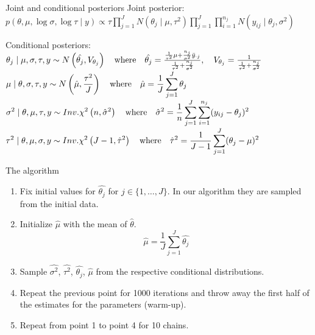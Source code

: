 \begin{frame}{Joint and conditional posteriors}
Joint posterior:\\
\vspace{0.1in}
$\displaystyle p(\theta,\mu,\log\sigma,\log\tau \mid y) \propto \tau \prod_{j=1}^J N(\theta_j \mid \mu,\tau^2) \prod_{j=1}^{J} \prod_{i=1}^{n_j} N(y_{ij} \mid \theta_j,\sigma^2)$

Conditional posteriors:\\
\vspace{0.1in}
$\theta_j \mid \mu, \sigma, \tau, y \sim N  \left( \hat{\theta_j},V_{\theta_j} \right)  \quad \mbox{where} \quad \hat{\theta_j} = { {{1 \over \tau^2} \mu + {n_j \over \sigma^2} \bar{y}_{\cdot j} } \over {{1 \over \tau^2}+{n_j \over \sigma^2}}}, \quad V_{\theta_j}= { 1 \over {{1 \over \tau^2}+{n_j \over \sigma^2}}} $ \\

$ \displaystyle \mu \mid \theta, \sigma, \tau, y \sim N \left( \hat{\mu},{\tau^2 \over J} \right) \quad \mbox{where} \quad \hat{\mu} = {1 \over J} \sum_{j=1}^{J} \theta_j $ \\

$ \displaystyle \sigma^2 \mid \theta, \mu, \tau, y \sim Inv.\chi^2 \left( n,\hat{\sigma}^2 \right)  \quad \mbox{where} \quad \hat{\sigma}^2 = {1 \over n} \sum_{j=1}^{J} \sum_{i=1}^{n_j} (y_{ij}-\theta_j)^2 $ \\

$ \displaystyle \tau^2 \mid \theta, \mu, \sigma, y \sim Inv.\chi^2 \left( J-1,\hat{\tau}^2 \right)  \quad \mbox{where} \quad \hat{\tau}^2 = {1 \over {J-1}} \sum_{j=1}^{J} (\theta_j-\mu)^2 $

\end{frame}

\begin{frame}{The algorithm}
\begin{enumerate}
\item Fix initial values for $\hat{\theta_j}$ for $j \in \{1,\dots, J\}$. In our algorithm they are sampled from the initial data.
\item Initialize $\hat{\mu}$ with the mean of $\hat{\theta}$.
\begin{equation}
\hat{\mu} = \frac{1}{J} \sum_{j=1}^J \hat{\theta_j}
\end{equation}
\item Sample $\hat{\sigma^2}$, $\hat{\tau^2}$, $\hat{\theta_j}$, $\hat{\mu}$ from the respective conditional distributions.
\item Repeat the previous point for 1000 iterations and throw away the first half of the estimates for the parameters (warm-up).
\item Repeat from point 1 to point 4 for 10 chains.
\end{enumerate}
\end{frame}

